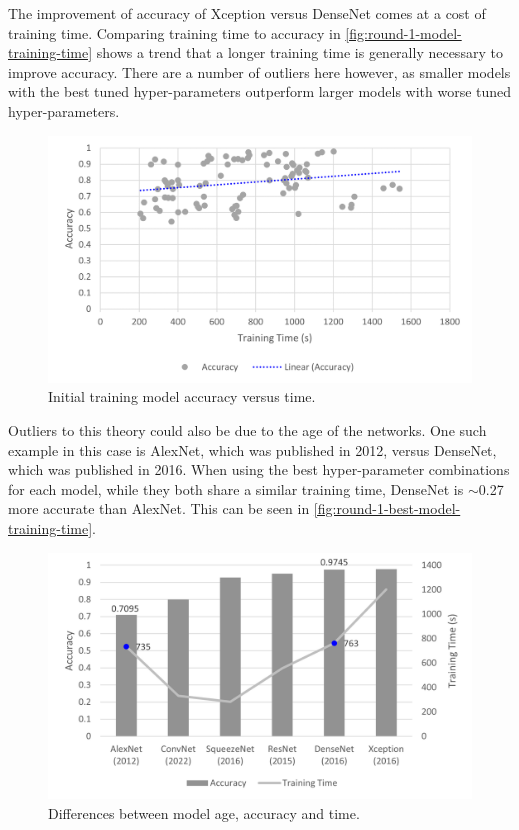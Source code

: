 The improvement of accuracy of Xception versus DenseNet comes at a cost of training time. Comparing training time to accuracy in \autoref{fig:round-1-model-training-time} shows a trend that a longer training time is generally necessary to improve accuracy. There are a number of outliers here however, as smaller models with the best tuned hyper-parameters outperform larger models with worse tuned hyper-parameters.

\begin{figure}[H]
    \centering
    \includegraphics[width=\textwidth]{figures/round-1-model-training-time2.png}
    \caption{Initial training model accuracy versus time.}
    \label{fig:round-1-model-training-time}
\end{figure}

Outliers to this theory could also be due to the age of the networks. One such example in this case is AlexNet, which was published in 2012, versus DenseNet, which was published in 2016. When using the best hyper-parameter combinations for each model, while they both share a similar training time, DenseNet is $\sim$0.27 more accurate than AlexNet. This can be seen in \autoref{fig:round-1-best-model-training-time}.

\begin{figure}[H]
    \centering
    \includegraphics[width=\textwidth]{figures/round-1-best-model-training-time.png}
    \caption{Differences between model age, accuracy and time.}
    \label{fig:round-1-best-model-training-time}
\end{figure}

